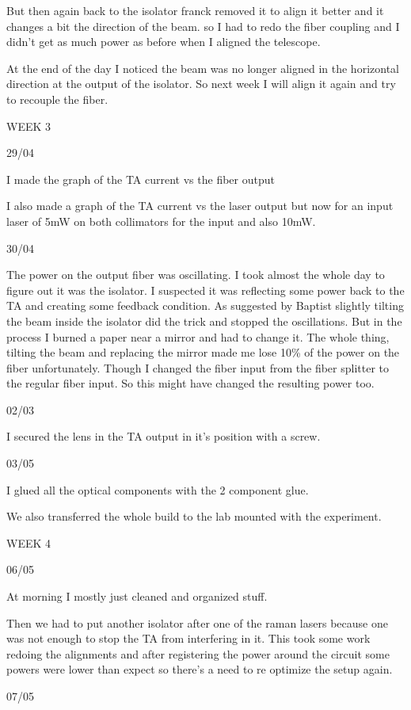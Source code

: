 But then again back to the isolator franck removed it to align it better and it changes a bit the direction of the beam. so I had to redo the fiber coupling and I didn't get as much power as before when I aligned the telescope. 

At the end of the day I noticed the beam was no longer aligned in the horizontal direction at the output of the isolator. So next week I will align it again and try to recouple the fiber.

WEEK 3

29/04

I made the graph of the TA current vs the fiber output

I also made a graph of the TA current vs the laser output but now for an input laser of 5mW on both collimators for the input and also 10mW.

30/04

The power on the output fiber was oscillating. I took almost the whole day to figure out it was the isolator. I suspected it was reflecting some power back to the TA and creating some feedback condition. As suggested by Baptist slightly tilting the beam inside the isolator did the trick and stopped the oscillations. But in the process I burned a paper near a mirror and had to change it. The whole thing, tilting the beam and replacing the mirror made me lose 10\% of the power on the fiber unfortunately. Though I changed the fiber input from the fiber splitter to the regular fiber input. So this might have changed the resulting power too.

02/03

I secured the lens in the TA output in it's position with a screw.

03/05

I glued all the optical components with the 2 component glue.

We also transferred the whole build to the lab mounted with the experiment.

WEEK 4

06/05

At morning I mostly just cleaned and organized stuff.

Then we had to put another isolator after one of the raman lasers because one was not enough to stop the TA from interfering in it. This took some work redoing the alignments and after registering the power around the circuit some powers were lower than expect so there's a need to re optimize the setup again.

07/05

